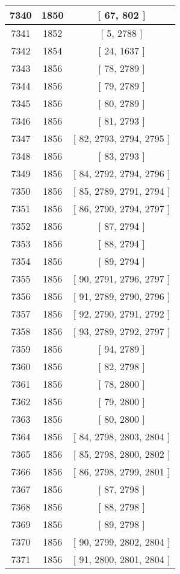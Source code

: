 \begin{center}
\begin{longtable}[H]{|| c c c ||}
\hline
7340 & 1850 & [ 67, 802 ] \\ 
\hline
7341 & 1852 & [ 5, 2788 ] \\ 
\hline
7342 & 1854 & [ 24, 1637 ] \\ 
\hline
7343 & 1856 & [ 78, 2789 ] \\ 
\hline
7344 & 1856 & [ 79, 2789 ] \\ 
\hline
7345 & 1856 & [ 80, 2789 ] \\ 
\hline
7346 & 1856 & [ 81, 2793 ] \\ 
\hline
7347 & 1856 & [ 82, 2793, 2794, 2795 ] \\ 
\hline
7348 & 1856 & [ 83, 2793 ] \\ 
\hline
7349 & 1856 & [ 84, 2792, 2794, 2796 ] \\ 
\hline
7350 & 1856 & [ 85, 2789, 2791, 2794 ] \\ 
\hline
7351 & 1856 & [ 86, 2790, 2794, 2797 ] \\ 
\hline
7352 & 1856 & [ 87, 2794 ] \\ 
\hline
7353 & 1856 & [ 88, 2794 ] \\ 
\hline
7354 & 1856 & [ 89, 2794 ] \\ 
\hline
7355 & 1856 & [ 90, 2791, 2796, 2797 ] \\ 
\hline
7356 & 1856 & [ 91, 2789, 2790, 2796 ] \\ 
\hline
7357 & 1856 & [ 92, 2790, 2791, 2792 ] \\ 
\hline
7358 & 1856 & [ 93, 2789, 2792, 2797 ] \\ 
\hline
7359 & 1856 & [ 94, 2789 ] \\ 
\hline
7360 & 1856 & [ 82, 2798 ] \\ 
\hline
7361 & 1856 & [ 78, 2800 ] \\ 
\hline
7362 & 1856 & [ 79, 2800 ] \\ 
\hline
7363 & 1856 & [ 80, 2800 ] \\ 
\hline
7364 & 1856 & [ 84, 2798, 2803, 2804 ] \\ 
\hline
7365 & 1856 & [ 85, 2798, 2800, 2802 ] \\ 
\hline
7366 & 1856 & [ 86, 2798, 2799, 2801 ] \\ 
\hline
7367 & 1856 & [ 87, 2798 ] \\ 
\hline
7368 & 1856 & [ 88, 2798 ] \\ 
\hline
7369 & 1856 & [ 89, 2798 ] \\ 
\hline
7370 & 1856 & [ 90, 2799, 2802, 2804 ] \\ 
\hline
7371 & 1856 & [ 91, 2800, 2801, 2804 ] \\ 

\end{longtable}
\end{center}
